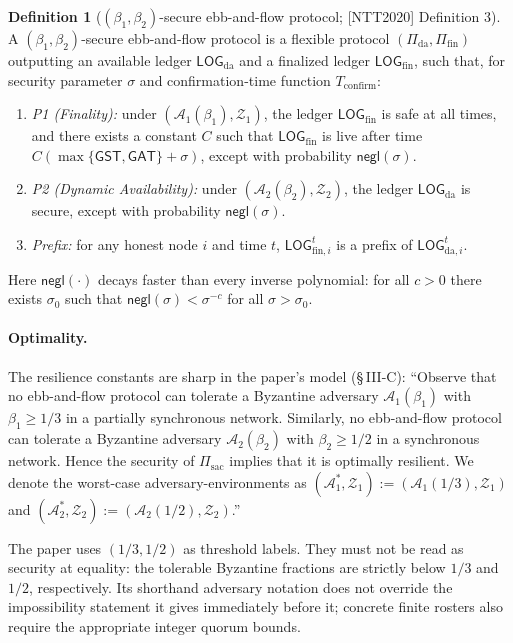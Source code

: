 \documentclass[11pt,a4paper]{article}
\theoremstyle{definition}
\newtheorem{definition}[theorem]{Definition}
\newcommand{\negl}{\mathsf{negl}}
\begin{document}
\begin{definition}[$(\beta_1, \beta_2)$-secure ebb-and-flow protocol;
{[NTT2020]} Definition 3]\label{def:xl-ebb-flow}
A $(\beta_1, \beta_2)$-secure ebb-and-flow protocol is a flexible protocol
$(\Pi_{\mathrm{da}}, \Pi_{\mathrm{fin}})$ outputting an available ledger
$\mathsf{LOG}_{\mathrm{da}}$ and a finalized ledger
$\mathsf{LOG}_{\mathrm{fin}}$, such that, for security parameter $\sigma$
and confirmation-time function $T_{\mathrm{confirm}}$:
\begin{enumerate}
\item \emph{P1 (Finality):} under
  $(\mathcal{A}_1(\beta_1), \mathcal{Z}_1)$, the ledger
  $\mathsf{LOG}_{\mathrm{fin}}$ is safe at all times, and there exists a
  constant $C$ such that $\mathsf{LOG}_{\mathrm{fin}}$ is live after time
  $C(\max\{\mathsf{GST}, \mathsf{GAT}\} + \sigma)$, except with
  probability $\negl(\sigma)$.
\item \emph{P2 (Dynamic Availability):} under
  $(\mathcal{A}_2(\beta_2), \mathcal{Z}_2)$, the ledger
  $\mathsf{LOG}_{\mathrm{da}}$ is secure, except with probability
  $\negl(\sigma)$.
\item \emph{Prefix:} for any honest node $i$ and time $t$,
  $\mathsf{LOG}_{\mathrm{fin},i}^t$ is a prefix of
  $\mathsf{LOG}_{\mathrm{da},i}^t$.
\end{enumerate}
Here $\negl(\cdot)$ decays faster than every inverse polynomial: for all $c > 0$
there exists $\sigma_0$ such that $\negl(\sigma) < \sigma^{-c}$ for all
$\sigma > \sigma_0$.
\end{definition}

\paragraph{Optimality.} The resilience constants are sharp in the paper's
model (\S\,III-C): ``Observe that no ebb-and-flow protocol can tolerate a
Byzantine adversary $\mathcal{A}_1(\beta_1)$ with $\beta_1 \ge 1/3$ in a
partially synchronous network. Similarly, no ebb-and-flow protocol can
tolerate a Byzantine adversary $\mathcal{A}_2(\beta_2)$ with
$\beta_2 \ge 1/2$ in a synchronous network. Hence the security of
$\Pi_{\mathrm{sac}}$ implies that it is optimally resilient. We denote the
worst-case adversary-environments as
$(\mathcal{A}_1^*, \mathcal{Z}_1) := (\mathcal{A}_1(1/3), \mathcal{Z}_1)$
and
$(\mathcal{A}_2^*, \mathcal{Z}_2) := (\mathcal{A}_2(1/2), \mathcal{Z}_2)$.''

The paper uses $(1/3,1/2)$ as threshold labels. They must not be read as
security at equality: the tolerable Byzantine fractions are strictly
below $1/3$ and $1/2$, respectively. Its shorthand adversary notation
does not override the impossibility statement it gives immediately
before it; concrete finite rosters also require the appropriate integer
quorum bounds.
\end{document}
